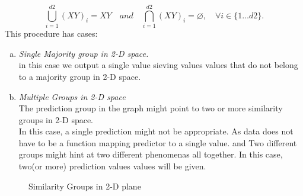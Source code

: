 \documentclass[a4paper]{article}
\begin{document}
\begin{equation}
\bigcup\limits_{i=1}^{d2}(XY)_i = XY\quad and \quad\bigcap\limits_{i=1}^{d2}(XY)_i=\varnothing, \quad  \forall i\in\{1\dots d2\}.
\end{equation}
This procedure has cases:
\begin{enumerate}[(a)]
\item \emph{Single Majority group in 2-D space.}\\
in this case we output a single value
sieving values values that do not belong to a majority group in 2-D space.
\item \emph{Multiple Groups in 2-D space}\\
The prediction group in the graph might point to two or more similarity groups in 2-D space.\\In this case,  a single prediction might not be appropriate. 
As data does not have to be a function mapping predictor to a single value.
and Two different groups might hint at two different phenomenas all together.
In this case, two(or more) prediction values values will be given.\\
\end{enumerate}
\begin{figure}[ht]
\centering
{}
\centering
{}
\caption[Optional caption for list of figures]{Similarity Groups in 2-D plane
 }
\label{fig:subfigureExample}
\end{figure}
\end{document}
